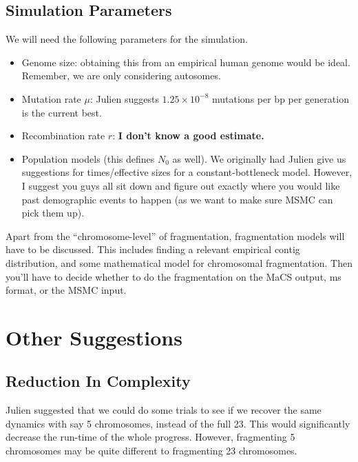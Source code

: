 \documentclass[11pt,a4paper]{article}
\begin{document}
\subsection{Simulation Parameters}
We will need the following parameters for the simulation.
\begin{itemize}
\item Genome size: obtaining this from an empirical human genome would be ideal. Remember, we are only considering autosomes.
\item Mutation rate $\mu$: Julien suggests $1.25\times 10^{-8}$ mutations per bp per generation is the current best. 
\item Recombination rate $r$: \textbf{I don't know a good estimate.}
\item Population models (this defines $N_0$ as well). We originally had Julien give us suggestions for times/effective sizes for a constant-bottleneck model. However, I suggest you guys all sit down and figure out exactly where you would like past demographic events to happen (as we want to make sure MSMC can pick them up).
\end{itemize}
Apart from the ``chromosome-level'' of fragmentation, fragmentation models will have to be discussed. This includes finding a relevant empirical contig distribution, and some mathematical model for chromosomal fragmentation. Then you'll have to decide whether to do the fragmentation on the MaCS output, ms format, or the MSMC input.

\section{Other Suggestions}
\subsection{Reduction In Complexity}
Julien suggested that we could do some trials to see if we recover the same dynamics with say 5 chromosomes, instead of the full 23. This would significantly decrease the run-time of the whole progress. However, fragmenting 5 chromosomes may be quite different to fragmenting 23 chromosomes.



{}
\end{document}
